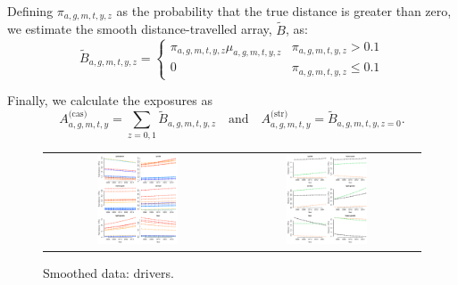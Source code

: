 \documentclass{article}
\begin{document}
Defining $\pi_{a,g,m,t,y,z}$ as the probability that the true distance is greater than zero, we estimate the smooth distance-travelled array, $\tilde{B}$, as:
$$\tilde{B}_{a,g,m,t,y,z}=\left\{\begin{array}{ll}\pi_{a,g,m,t,y,z}\mu_{a,g,m,t,y,z} & \pi_{a,g,m,t,y,z}>0.1\\ 0 & \pi_{a,g,m,t,y,z} \leq 0.1 \end{array}\right.$$  

Finally, we calculate the exposures as $$A_{a,g,m,t,y}^{\text{(cas)}}=\sum_{z=0,1}\tilde{B}_{a,g,m,t,y,z}\quad\text{and}\quad A_{a,g,m,t,y}^{\text{(str)}}=\tilde{B}_{a,g,m,t,y,z=0}.$$


\begin{figure}[H]
\centering
\begin{tabular}{cc}
\includegraphics[width=0.45\textwidth]{driverSmooth.pdf}&\includegraphics[width=0.45\textwidth]{roadsSmooth.pdf}
\end{tabular}
\caption{\small Smoothed data: drivers.}
\label{smoothdrive}
\end{figure}
\end{document}
